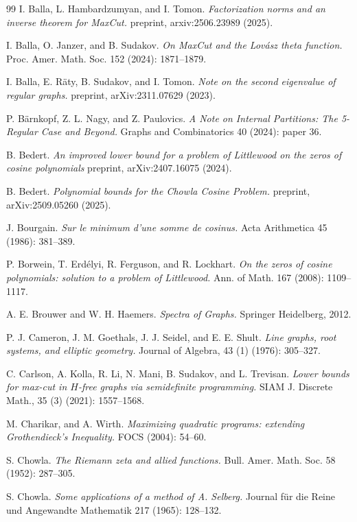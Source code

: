 \documentclass[11pt]{article}
\theoremstyle{plain}
\theoremstyle{definition}
\begin{document}
\begin{thebibliography}{99}
I. Balla, L. Hambardzumyan, and I. Tomon.
\emph{Factorization norms and an inverse theorem for MaxCut.}
preprint, arxiv:2506.23989 (2025).

I. Balla, O. Janzer, and B. Sudakov.
\emph{On MaxCut and the Lov\'asz theta function.}
Proc. Amer. Math. Soc. 152 (2024): 1871--1879.

 I. Balla, E. R\"aty, B. Sudakov, and I. Tomon.
 \emph{Note on the second eigenvalue of regular graphs.}
 preprint, arXiv:2311.07629 (2023).

 P. B\"arnkopf, Z. L. Nagy, and Z. Paulovics.
 \emph{A Note on Internal Partitions: The 5-Regular Case and Beyond.}
 Graphs and Combinatorics 40 (2024): paper 36.

B. Bedert. 
\emph{An improved lower bound for a problem of Littlewood on the zeros of cosine polynomials}
preprint, arXiv:2407.16075 (2024).

B. Bedert.
\emph{Polynomial bounds for the Chowla Cosine Problem.}
preprint, arXiv:2509.05260 (2025).

J. Bourgain.
\emph{Sur le minimum d'une somme de cosinus.}
Acta Arithmetica 45 (1986): 381--389.

P. Borwein, T. Erd\'{e}lyi, R. Ferguson, and R. Lockhart. 
\emph{On the zeros of cosine polynomials: solution to a problem of Littlewood.} Ann. of Math. 167 (2008): 1109--1117.

A. E. Brouwer and W. H. Haemers.
\emph{Spectra of Graphs.}
Springer Heidelberg, 2012.

P. J. Cameron, J. M. Goethals, J. J. Seidel, and E. E. Shult.
\emph{Line graphs, root systems, and elliptic geometry.}
Journal of Algebra, 43 (1) (1976): 305--327.

C. Carlson, A. Kolla, R. Li, N. Mani, B. Sudakov, and L. Trevisan.
\emph{Lower bounds for max-cut in $H$-free graphs via semidefinite programming.}
SIAM J. Discrete Math., 35 (3) (2021): 1557--1568.

M. Charikar, and A. Wirth.
\emph{Maximizing quadratic programs: extending Grothendieck's Inequality.}
FOCS (2004): 54--60.

S. Chowla.
\emph{The Riemann zeta and allied functions.}
Bull. Amer. Math. Soc. 58 (1952): 287--305.

S. Chowla.
\emph{Some applications of a method of A. Selberg.}
Journal f\"ur die Reine und Angewandte Mathematik 217 (1965): 128--132.


\end{thebibliography}
\end{document}
